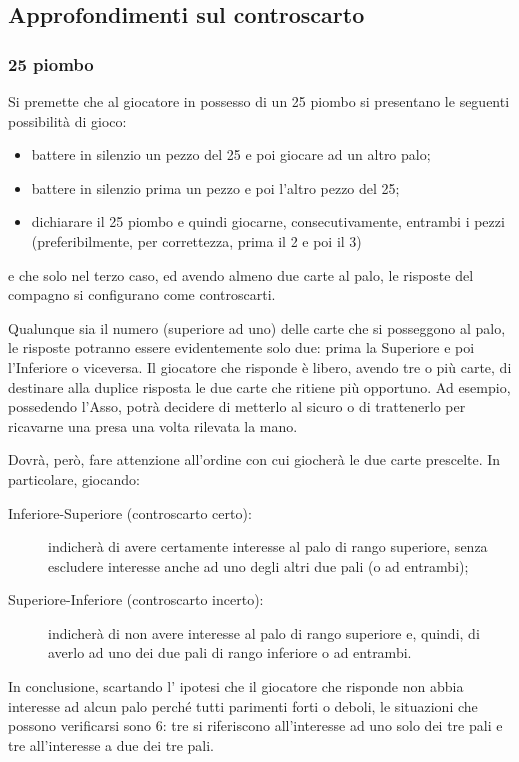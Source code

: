 \documentclass[italian,a4paper]{article}
\newenvironment{packeditem}{
\begin{itemize}
  \setlength{\itemsep}{1pt}
  \setlength{\parskip}{0pt}
  \setlength{\parsep}{0pt}
}{\end{itemize}}
\begin{document}
\subsection{Approfondimenti sul controscarto}
\subsubsection{25 piombo}
Si premette che al giocatore in possesso di un 25 piombo si presentano le seguenti possibilità di gioco:
\begin{packeditem}
\item battere in silenzio un pezzo del 25 e poi giocare ad un altro palo;
\item battere in silenzio prima un pezzo e poi l'altro pezzo del 25;
\item dichiarare il 25 piombo e quindi giocarne, consecutivamente, entrambi i pezzi (preferibilmente, per correttezza, prima il 2 e poi il 3)
\end{packeditem}
e che solo nel terzo caso, ed avendo almeno due carte al palo, le risposte del compagno si configurano come controscarti.

Qualunque sia il numero (superiore ad uno) delle carte che si posseggono al palo, le risposte potranno essere evidentemente solo due: prima la Superiore e poi l'Inferiore o viceversa.
Il giocatore che risponde è libero, avendo tre o più carte, di destinare alla duplice risposta le due carte che ritiene più opportuno. Ad esempio, possedendo l'Asso, potrà decidere di metterlo al sicuro o di trattenerlo per ricavarne una presa una volta rilevata la mano.

Dovrà, però, fare attenzione all'ordine con cui giocherà le due carte prescelte. In particolare, giocando:
\begin{description}
    \item[Inferiore-Superiore (controscarto certo):] indicherà di avere certamente interesse al palo di rango superiore, senza escludere interesse anche ad uno degli altri due pali (o ad entrambi);
\item[Superiore-Inferiore (controscarto incerto):] indicherà di non avere interesse al palo di rango superiore e, quindi, di averlo ad uno dei due pali di rango inferiore o ad entrambi.
\end{description}
 
In conclusione, scartando l' ipotesi che il giocatore che risponde non abbia interesse ad alcun palo perché tutti parimenti forti o deboli, le situazioni che possono verificarsi sono 6: tre si riferiscono all'interesse ad uno solo dei tre pali e tre all'interesse a due dei tre pali.
\end{document}
